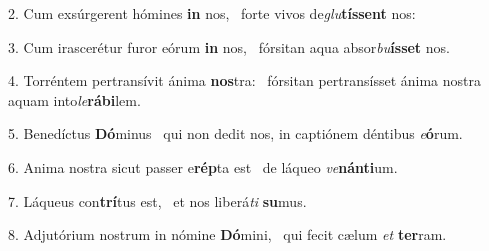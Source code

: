 2. Cum exsúrgerent hómines \textbf{in} nos, \ast\  forte vivos de\textit{glu}\textbf{tís}\textbf{sent} nos:\

3. Cum irascerétur furor eórum \textbf{in} nos, \ast\  fórsitan aqua absor\textit{bu}\textbf{ís}\textbf{set} nos.\

4. Torréntem pertransívit ánima \textbf{nos}tra: \ast\  fórsitan pertransísset ánima nostra aquam into\textit{le}\textbf{rá}\textbf{bi}lem.\

5. Benedíctus \textbf{Dó}minus \ast\  qui non dedit nos, in captiónem déntibus \textit{e}\textbf{ó}rum.\

6. Anima nostra sicut passer e\textbf{rép}ta est \ast\  de láqueo \textit{ve}\textbf{nán}\textbf{ti}um.\

7. Láqueus con\textbf{trí}tus est, \ast\  et nos liberá\textit{ti} \textbf{su}mus.\

8. Adjutórium nostrum in nómine \textbf{Dó}mini, \ast\  qui fecit cælum \textit{et} \textbf{ter}ram.\

